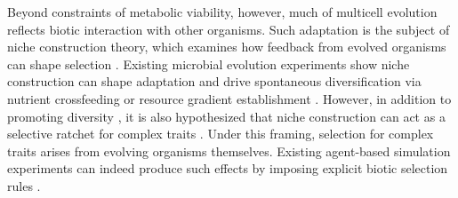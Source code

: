 Beyond constraints of metabolic viability, however, much of multicell evolution reflects biotic interaction with other organisms.
Such adaptation is the subject of niche construction theory, which examines how feedback from evolved organisms can shape selection \citep{odlingsmee2003niche,odlingsmee1988niche,levins1985dialectical,lewontin1983gene}.
Existing microbial evolution experiments show niche construction can shape adaptation and drive spontaneous diversification via nutrient crossfeeding or resource gradient establishment \citep{poltak2010ecological,traverse2012tangled,kirisits2005characterization,ellis2015character,rosenzweig1994microbial,treves1998repeated,koza2010environmental,callahan2014rapid}.
However, in addition to promoting diversity \citep{laland2017niche,brathen2015niche}, it is also hypothesized that niche construction can act as a selective ratchet for complex traits \citep{Waddington2008,laland2014niche,creanza2016cultural}.
Under this framing, selection for complex traits arises from evolving organisms themselves.
Existing agent-based simulation experiments can indeed produce such effects by imposing explicit biotic selection rules \citep{taylor2004niche,zaman2014coevolution,TODO}.

